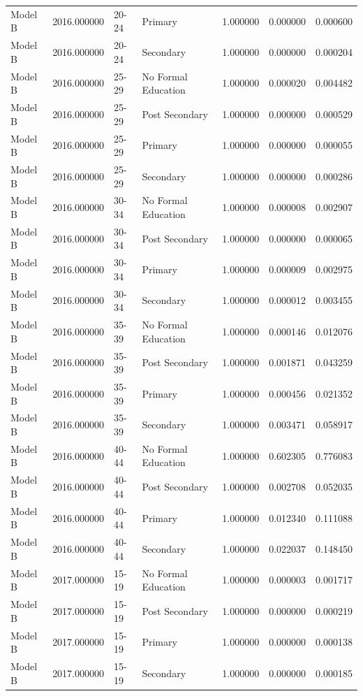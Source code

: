 \begin{table}[ht]
\begin{tabular}{lrllrrr}
Model B & 2016.000000 & 20-24 & Primary & 1.000000 & 0.000000 & 0.000600 \\
Model B & 2016.000000 & 20-24 & Secondary & 1.000000 & 0.000000 & 0.000204 \\
Model B & 2016.000000 & 25-29 & No Formal Education & 1.000000 & 0.000020 & 0.004482 \\
Model B & 2016.000000 & 25-29 & Post Secondary & 1.000000 & 0.000000 & 0.000529 \\
Model B & 2016.000000 & 25-29 & Primary & 1.000000 & 0.000000 & 0.000055 \\
Model B & 2016.000000 & 25-29 & Secondary & 1.000000 & 0.000000 & 0.000286 \\
Model B & 2016.000000 & 30-34 & No Formal Education & 1.000000 & 0.000008 & 0.002907 \\
Model B & 2016.000000 & 30-34 & Post Secondary & 1.000000 & 0.000000 & 0.000065 \\
Model B & 2016.000000 & 30-34 & Primary & 1.000000 & 0.000009 & 0.002975 \\
Model B & 2016.000000 & 30-34 & Secondary & 1.000000 & 0.000012 & 0.003455 \\
Model B & 2016.000000 & 35-39 & No Formal Education & 1.000000 & 0.000146 & 0.012076 \\
Model B & 2016.000000 & 35-39 & Post Secondary & 1.000000 & 0.001871 & 0.043259 \\
Model B & 2016.000000 & 35-39 & Primary & 1.000000 & 0.000456 & 0.021352 \\
Model B & 2016.000000 & 35-39 & Secondary & 1.000000 & 0.003471 & 0.058917 \\
Model B & 2016.000000 & 40-44 & No Formal Education & 1.000000 & 0.602305 & 0.776083 \\
Model B & 2016.000000 & 40-44 & Post Secondary & 1.000000 & 0.002708 & 0.052035 \\
Model B & 2016.000000 & 40-44 & Primary & 1.000000 & 0.012340 & 0.111088 \\
Model B & 2016.000000 & 40-44 & Secondary & 1.000000 & 0.022037 & 0.148450 \\
Model B & 2017.000000 & 15-19 & No Formal Education & 1.000000 & 0.000003 & 0.001717 \\
Model B & 2017.000000 & 15-19 & Post Secondary & 1.000000 & 0.000000 & 0.000219 \\
Model B & 2017.000000 & 15-19 & Primary & 1.000000 & 0.000000 & 0.000138 \\
Model B & 2017.000000 & 15-19 & Secondary & 1.000000 & 0.000000 & 0.000185 \\

\end{tabular}
\end{table}
